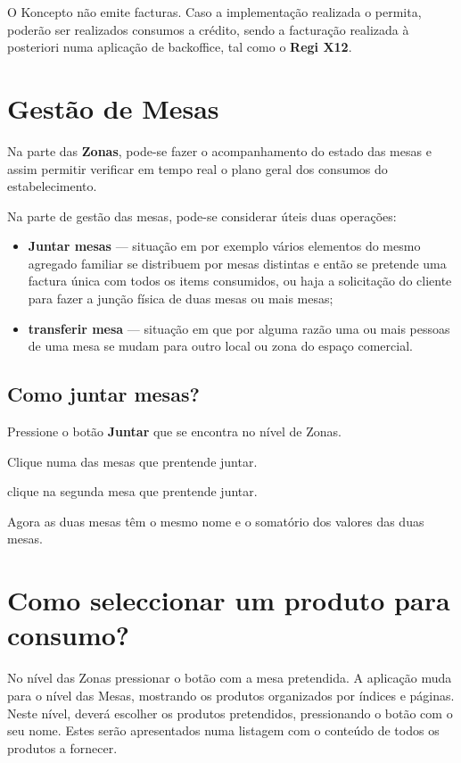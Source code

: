 \documentclass[a4paper,11pt,openany]{memoir}
\begin{document}
O Koncepto não emite facturas. Caso a implementação realizada
o permita, poderão ser realizados consumos a crédito, sendo a facturação realizada
à posteriori numa aplicação de backoffice, tal como o \textbf{Regi X12}.

\section{Gestão de Mesas}

Na parte das \textbf{Zonas}, pode-se fazer o acompanhamento do estado das mesas e assim
permitir verificar em tempo real o plano geral dos consumos do estabelecimento.

Na parte de gestão das mesas, pode-se considerar úteis duas operações:
\begin{itemize}
\item \textbf{Juntar mesas} --- situação em por exemplo vários elementos do mesmo agregado familiar
se distribuem por mesas distintas e então se pretende uma factura única com todos os items
consumidos, ou haja a solicitação do cliente para fazer a junção física de duas mesas ou mais mesas;
\item \textbf{transferir mesa} --- situação em que por alguma razão uma ou mais pessoas de uma mesa
se mudam para outro local ou zona do espaço comercial. 
\end{itemize}

\subsection{Como juntar mesas?}

Pressione o botão \textbf{Juntar} que se encontra no nível de Zonas.

Clique numa das mesas que prentende juntar.

clique na segunda mesa que prentende juntar.

Agora as duas mesas têm o mesmo nome e o somatório dos valores das duas mesas.

\section{Como seleccionar um produto para consumo?}

No nível das Zonas pressionar o botão com a mesa pretendida. A aplicação muda
para o nível das Mesas, mostrando os produtos organizados por índices e páginas.
Neste nível, deverá escolher os produtos pretendidos, pressionando o botão com o
seu nome. Estes serão apresentados numa listagem com o conteúdo de todos os
produtos a fornecer.
\end{document}
